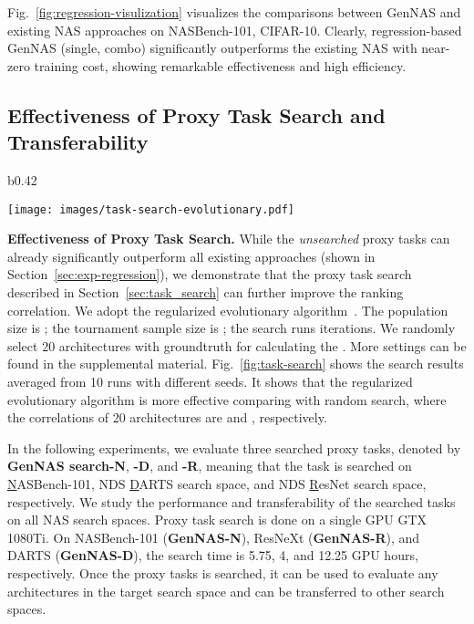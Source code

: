 \documentclass{article}
\begin{document}
\vspace{-5pt}


Fig.~\ref{fig:regression-visulization} visualizes the comparisons between GenNAS and existing NAS approaches on NASBench-101, CIFAR-10. Clearly, regression-based GenNAS (single, combo) significantly outperforms the existing NAS with near-zero training cost, showing remarkable effectiveness and high efficiency.

\vspace{-13pt}

\subsection{Effectiveness of Proxy Task Search and Transferability}
\label{sec:task-search-transfer}
\vspace{-8pt}


\begin{wrapfigure}{b}{0.42\textwidth}
\vspace{-14pt}
  \begin{center}
    \texttt{[image: images/task-search-evolutionary.pdf]}
  \end{center}
  \vspace{-10pt}
  \caption{Proxy task search.}
  \label{fig:task-search}
\end{wrapfigure}



\textbf{Effectiveness of Proxy Task Search.} 
While the \textit{unsearched} proxy tasks can already significantly outperform all existing approaches (shown in Section~\ref{sec:exp-regression}), we demonstrate that the proxy task search described in Section~\ref{sec:task_search} can further improve the ranking correlation.
We adopt the regularized evolutionary algorithm~\cite{real2019regularized}. The population size is ; the tournament sample size is ; 
the search runs  iterations. We randomly select 20 architectures with groundtruth for calculating the . More settings can be found in the supplemental material.
Fig.~\ref{fig:task-search} shows the search results averaged from 10 runs with different seeds.
It shows that the regularized evolutionary algorithm is more effective comparing with random search, where the correlations of 20 architectures are  and , respectively.



In the following experiments, we evaluate three searched proxy tasks, denoted by \textbf{GenNAS search-N}, \textbf{-D}, and \textbf{-R}, meaning that the task is searched on \underline{N}ASBench-101, NDS \underline{D}ARTS search space, and NDS \underline{R}esNet search space, respectively.
We study the performance and transferability of the searched tasks on all NAS search spaces. Proxy task search is done on a single GPU GTX 1080Ti. On NASBench-101 (\textbf{GenNAS-N}), ResNeXt (\textbf{GenNAS-R}), and DARTS (\textbf{GenNAS-D}), the search time is 5.75, 4, and 12.25 GPU hours, respectively. Once the proxy tasks is searched, it can be used to evaluate any architectures in the target search space and can be transferred to other search spaces.
\end{document}
